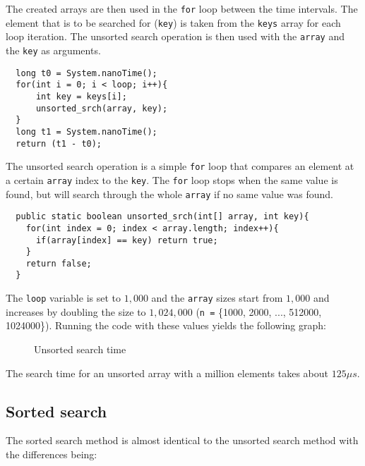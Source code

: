 \documentclass[a4paper,11pt]{article}
\begin{document}
The created arrays are then used in the {\tt for} loop between the time 
intervals. The element that is to be searched for ({\tt key}) is taken 
from the {\tt keys} array for each loop iteration. The unsorted search
operation is then used with the {\tt array} and the {\tt key} as 
arguments.

\begin{verbatim}
  long t0 = System.nanoTime();
  for(int i = 0; i < loop; i++){
      int key = keys[i];
      unsorted_srch(array, key);
  }
  long t1 = System.nanoTime();
  return (t1 - t0);
\end{verbatim}

The unsorted search operation is a simple {\tt for} loop that compares
an element at a certain {\tt array} index to the {\tt key}. The 
{\tt for} loop stops when the same value is found, but will 
search through the whole {\tt array} if no same value was found.

\begin{verbatim}
  public static boolean unsorted_srch(int[] array, int key){
    for(int index = 0; index < array.length; index++){
      if(array[index] == key) return true;
    }
    return false;
  }
\end{verbatim}

The {\tt loop} variable is set to $ 1,000$ and the {\tt array} sizes
start from $ 1,000$ and increases by doubling the size to $ 1,024,000$
({\tt n =} \{1000, 2000, ..., 512000, 1024000\}). Running the code with
these values yields the following graph:

\begin{figure}[h]
  \centering
  \caption{Unsorted search time}
  \label{fig:plot1}
\end{figure}

The search time for an unsorted array with a million elements takes 
about $ 125 \mu s$.

\subsection*{Sorted search}

The sorted search method is almost identical to the unsorted search 
method with the differences being:
\end{document}
